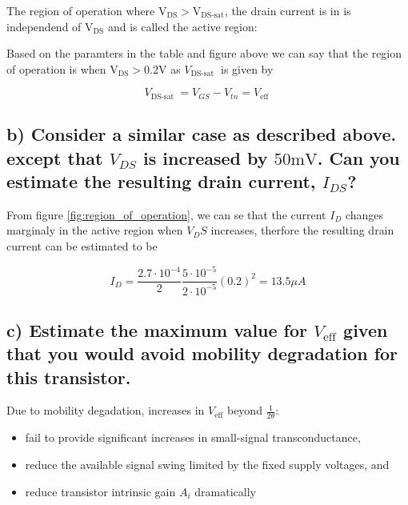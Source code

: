 The region of operation where $\text{V}_\text{DS}>\text{V}_\text{DS-sat}$, the drain current is in is independend of $\text{V}_\text{DS}$ and is called the active region: 


Based on the paramters in the table and figure above we can say that the region of operation is when $\text{V}_\text{DS}>0.2\text{V}$ as $V_{\text {DS-sat }}$ is given by

\begin{equation*}
    V_{\text {DS-sat }}=V_{G S}-V_{t n}=V_{\text {eff }} 
\end{equation*}

\subsection*{b) Consider a similar case as described above. except that \( V_{D S} \) is increased by \( 50 \mathrm{mV} \). Can you estimate the resulting drain current, \( I_{D S} \)?}
From figure \ref{fig:region_of_operation}, we can se that the current $I_D$ changes marginaly in the active region when $V_DS$ increases, therfore the resulting drain current can be estimated to be  

\begin{equation*}
    I_{D}=\frac{2.7\cdot10^{-4}}{2} \frac{5\cdot10^{-5}}{2\cdot10^{-5}}\left(0.2\right)^{2}=13.5\mu A
\end{equation*}

\subsection*{c) Estimate the maximum value for $V_{\text{eff}}$ given that you would avoid mobility degradation for this transistor.}
Due to mobility degadation, increases in $V_{\text{eff}}$ beyond $\frac{1}{2\theta}$:
\begin{itemize}
    \item fail to provide significant increases in small-signal transconductance,
    \item reduce the available signal swing limited by the fixed supply voltages, and
    \item reduce transistor intrinsic gain \textbf{$A_i$} dramatically
\end{itemize}

